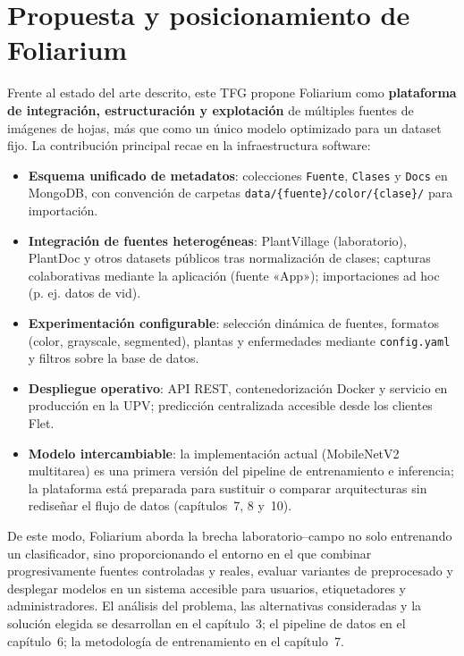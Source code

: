 \documentclass[11pt,spanish,listoffigures,listoftables]{tfgetsinf}
\begin{document}
\section{Propuesta y posicionamiento de Foliarium}

Frente al estado del arte descrito, este TFG propone Foliarium como \textbf{plataforma de integración, estructuración y explotación} de múltiples fuentes de imágenes de hojas, más que como un único modelo optimizado para un dataset fijo. La contribución principal recae en la infraestructura software:

\begin{itemize}
    \item \textbf{Esquema unificado de metadatos}: colecciones \texttt{Fuente}, \texttt{Clases} y \texttt{Docs} en MongoDB, con convención de carpetas \texttt{data/\{fuente\}/color/\{clase\}/} para importación.
    \item \textbf{Integración de fuentes heterogéneas}: PlantVillage (laboratorio), PlantDoc y otros datasets públicos tras normalización de clases; capturas colaborativas mediante la aplicación (fuente «App»); importaciones ad hoc (p. ej. datos de vid).
    \item \textbf{Experimentación configurable}: selección dinámica de fuentes, formatos (color, grayscale, segmented), plantas y enfermedades mediante \texttt{config.yaml} y filtros sobre la base de datos.
    \item \textbf{Despliegue operativo}: API REST, contenedorización Docker y servicio en producción en la UPV; predicción centralizada accesible desde los clientes Flet.
    \item \textbf{Modelo intercambiable}: la implementación actual (MobileNetV2 multitarea) es una primera versión del pipeline de entrenamiento e inferencia; la plataforma está preparada para sustituir o comparar arquitecturas sin rediseñar el flujo de datos (capítulos~7, 8 y~10).
\end{itemize}

De este modo, Foliarium aborda la brecha laboratorio--campo no solo entrenando un clasificador, sino proporcionando el entorno en el que combinar progresivamente fuentes controladas y reales, evaluar variantes de preprocesado y desplegar modelos en un sistema accesible para usuarios, etiquetadores y administradores. El análisis del problema, las alternativas consideradas y la solución elegida se desarrollan en el capítulo~3; el pipeline de datos en el capítulo~6; la metodología de entrenamiento en el capítulo~7.
\end{document}
